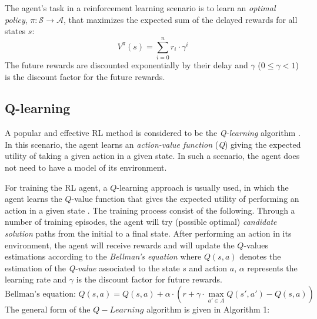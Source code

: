 The agent's task in a reinforcement learning scenario is to learn an \emph{optimal policy}, $\pi: \mathcal{S} \rightarrow \mathcal{A}$, that maximizes the expected sum of the delayed rewards for all states $s$: $$V^{\pi}(s)=\sum_{i=0}^{n} r_i \cdot \gamma^i$$ The future rewards are discounted exponentially by their delay and $\gamma$ ($0 \leq \gamma <1$)  is the discount factor for the future rewards.

\subsection{Q-learning}\label{qLearningAlgo}

A popular and effective RL method is considered to be the \emph{Q-learning} algorithm \cite{rsab}. In this scenario, the agent learns an \emph{action-value function} (\emph{Q}) giving the expected utility of taking a given action in a given state.  In such a scenario, the agent does not need to have a model of its environment.

For training the RL agent, a $Q$-learning approach is usually used, in which the agent learns the $Q$-value function that gives the expected utility of performing an action in a given state \cite{rsab}. The training process consist of the following. Through a number of training episodes, the agent will try (possible optimal) \emph{candidate solution} paths from the initial to a final state. After performing an action in its environment, the agent will receive rewards and will update the $Q$-values estimations according to the \emph{Bellman's equation} \cite{dayan} where $Q(s,a)$ denotes the estimation of the \emph{Q-value} associated to the state $s$ and action $a$, $\alpha$ represents the learning rate and $\gamma$ is the discount factor for future rewards.
$$ \text{Bellman's equation: } Q(s,a) = Q(s,a) + \alpha\cdot(r + \gamma \cdot \max_{a' \in A}Q(s', a')-Q(s,a))$$
The general form of the $Q-Learning$ algorithm is given in Algorithm 1:

{} \hrulefill {}

